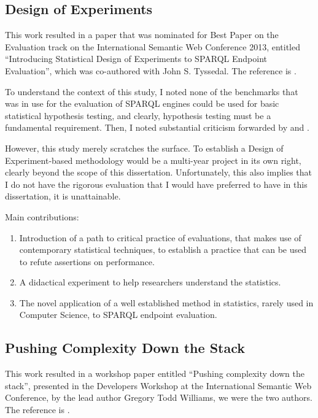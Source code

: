 \subsection{Design of Experiments}\label{sec:condoe}

This work resulted in a paper that was nominated for Best Paper on the
Evaluation track on the International Semantic Web Conference 2013,
entitled ``Introducing Statistical Design of Experiments to SPARQL
Endpoint Evaluation'', which was co-authored with John
S. Tyssedal. The reference is \cite{kjernsmo_doe_intro}.

To understand the context of this study, I noted none of the
benchmarks that was in use for the evaluation of SPARQL engines could
be used for basic statistical hypothesis testing, and clearly,
hypothesis testing must be a fundamental requirement. Then, I noted
substantial criticism forwarded by
\cite{Duan:2011:AOC:1989323.1989340} and \cite{MontoyaVCRA12}.

However, this study merely scratches the surface. To establish a
Design of Experiment-based methodology would be a multi-year project
in its own right, clearly beyond the scope of this
dissertation. Unfortunately, this also implies that I do not have the
rigorous evaluation that I would have preferred to have in this
dissertation, it is unattainable.

Main contributions:
\begin{enumerate}
\item Introduction of a path to critical practice of evaluations, that makes
  use of contemporary statistical techniques, to establish a practice
  that can be used to refute assertions on performance.
\item A didactical experiment to help researchers understand the statistics.
\item The novel application of a well established method in
  statistics, rarely used in Computer Science, to SPARQL endpoint
  evaluation.
  
\end{enumerate}

\subsection{Pushing Complexity Down the Stack}\label{sec:conpush}

This work resulted in a workshop paper entitled ``Pushing complexity
down the stack'', presented in the Developers Workshop at the
International Semantic Web Conference, by the lead author Gregory Todd
Williams, we were the two authors. The reference is
\cite{williamspushing}.

